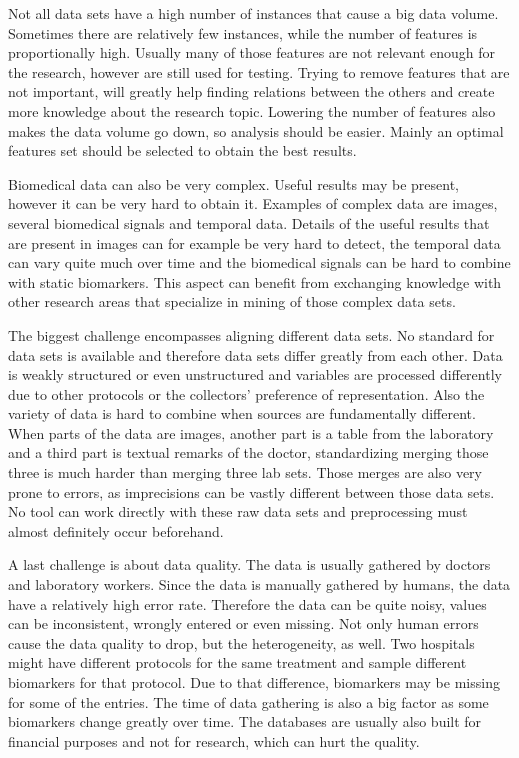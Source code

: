 \documentclass[10pt,a4paper]{article}
\begin{document}
	Not all data sets have a high number of instances that cause a big data volume. Sometimes there are relatively few instances, while the number of features is proportionally high. \cite{dubitzky2007fundamentals} Usually many of those features are not relevant enough for the research, however are still used for testing. Trying to remove features that are not important, will greatly help finding relations between the others and create more knowledge about the research topic. Lowering the number of features also makes the data volume go down, so analysis should be easier. Mainly an optimal features set should be selected to obtain the best results. \cite{PENG201015}
	
	Biomedical data can also be very complex. Useful results may be present, however it can be very hard to obtain it. Examples of complex data are images, several biomedical signals and temporal data. Details of the useful results that are present in images can for example be very hard to detect, the temporal data can vary quite much over time and the biomedical signals can be hard to combine with static biomarkers. \cite{Yoo2012} This aspect can benefit from exchanging knowledge with other research areas that specialize in mining of those complex data sets. \cite{Turkay2014, bellazzi2011data}
	
	The biggest challenge encompasses aligning different data sets. No standard for data sets is available and therefore data sets differ greatly from each other. Data is weakly structured or even unstructured \cite{Holzinger2014} and variables are processed differently due to other protocols or the collectors' preference of representation.\cite{Otasek2014} Also the variety of data is hard to combine when sources are fundamentally different. When parts of the data are images, another part is a table from the laboratory and a third part is textual remarks of the doctor, standardizing merging those three is much harder than merging three lab sets. Those merges are also very prone to errors, as imprecisions can be vastly different between those data sets. No tool can work directly with these raw data sets and preprocessing must almost definitely occur beforehand.\cite{Turkay2014, CIOS20021}
	
	A last challenge is about data quality. The data is usually gathered by doctors and laboratory workers. Since the data is manually gathered by humans, the data have a relatively high error rate. Therefore the data can be quite noisy, values can be inconsistent, wrongly entered or even missing.\cite{CIOS20021} Not only human errors cause the data quality to drop, but the heterogeneity, as well. Two hospitals might have different protocols for the same treatment and sample different biomarkers for that protocol. Due to that difference, biomarkers may be missing for some of the entries. The time of data gathering is also a big factor as some biomarkers change greatly over time. The databases are usually also built for financial purposes and not for research, which can hurt the quality. \cite{Yoo2012}
	
\end{document}
